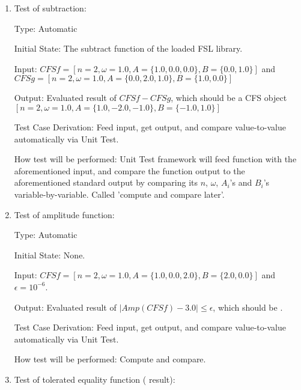 \documentclass[12pt, titlepage]{article}
\begin{document}
\begin{enumerate}
	
	\item{Test of subtraction: \\}
	
	Type: Automatic
	
	Initial State: The subtract function of the loaded FSL library.
	
	Input: $\mathit{CFSf}=[n=2, \omega=1.0, A=\{1.0, 0.0, 0.0\}, B=\{0.0, 1.0\}]$ and 
	$\mathit{CFSg}=[n=2, \omega=1.0, A=\{0.0, 2.0, 1.0\}, B=\{1.0, 0.0\}]$	 
	
	Output: Evaluated result of $\mathit{CFSf}-\mathit{CFSg}$, which should
        be a CFS object
        $[n=2, \omega=1.0, A=\{1.0, -2.0, -1.0\}, B=\{-1.0, 1.0\}]$
	
	Test Case Derivation: Feed input, get output, and compare value-to-value automatically via Unit Test. 
	
	How test will be performed: Unit Test framework will feed function with the aforementioned input,
        and compare the function output to the aforementioned standard output by
        comparing its $n$, $\omega$, $A_i$'s and $B_i$'s variable-by-variable. Called 'compute and compare later'.
	
	\item{Test of amplitude function: \\}					
	
	Type: Automatic
	
	Initial State: None.
	
	Input: $\mathit{CFSf}=[n=2, \omega=1.0, A=\{1.0, 0.0, 2.0\}, B=\{2.0,
        0.0\}]$ and $\epsilon=10^{-6}$.
	
	Output: Evaluated result of
        $|\mathit{Amp}(\mathit{CFSf})-3.0|\leq\epsilon$, which should be
        .
	
	Test Case Derivation: Feed input, get output, and compare value-to-value automatically via Unit Test.
	
	How test will be performed: Compute and compare.
	
	
	\item{Test of tolerated equality function  ( result): \\}
	

\end{enumerate}
\end{document}
